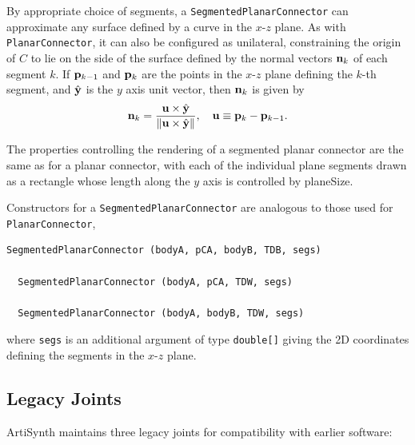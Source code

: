 By appropriate choice of segments, a {\tt SegmentedPlanarConnector}
can approximate any surface defined by a curve in the $x$-$z$ plane.
As with {\tt PlanarConnector}, it can also be configured as
unilateral, constraining the origin of $C$ to lie on the side of the
surface defined by the normal vectors ${\bf n}_k$ of each segment $k$. If
${\bf p}_{k-1}$ and ${\bf p}_k$ are the points in the $x$-$z$ plane defining the
$k$-th segment, and $\hat{{\bf y}}$ is the $y$ axis unit vector, then ${\bf n}_k$
is given by
%
\begin{equation}
{\bf n}_k = \frac{{\bf u} \times \hat{{\bf y}}}{\| {\bf u} \times \hat{{\bf y}}\|},
\quad {\bf u} \equiv {\bf p}_{k} -{\bf p}_{k-1}.
\end{equation}
%

The properties controlling the rendering of a segmented planar
connector are the same as for a planar connector, with each of the
individual plane segments drawn as a rectangle whose length along the
$y$ axis is controlled by {\sf planeSize}.

Constructors for a {\tt SegmentedPlanarConnector} are analogous to
those used for {\tt PlanarConnector},
\begin{lstlisting}[]
  SegmentedPlanarConnector (bodyA, pCA, bodyB, TDB, segs)

  SegmentedPlanarConnector (bodyA, pCA, TDW, segs)

  SegmentedPlanarConnector (bodyA, bodyB, TDW, segs)
\end{lstlisting}
%
where {\tt segs} is an additional argument of type {\tt double[]}
giving the 2D coordinates defining the segments in the $x$-$z$ plane.

\subsection{Legacy Joints}

ArtiSynth maintains three legacy joints for compatibility with earlier
software:

